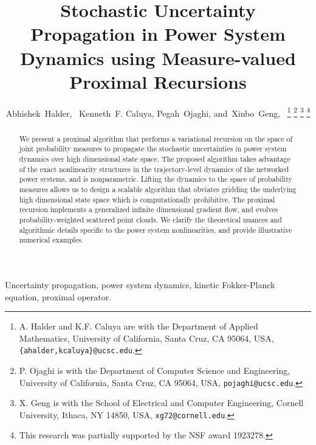 \documentclass[10pt,twocolumn]{IEEEtran}
\begin{document}
\title{\LARGE \bf Stochastic Uncertainty Propagation in Power System Dynamics using Measure-valued Proximal Recursions}

\author{Abhishek~Halder,~ 
        Kenneth~F. Caluya,
        Pegah~Ojaghi,
        and~Xinbo~Geng,~%
\thanks{A. Halder and K.F. Caluya are with the Department of Applied Mathematics, University of California, Santa Cruz, CA 95064, USA, {\texttt{\{ahalder,kcaluya\}@ucsc.edu}}.}%
\thanks{P. Ojaghi is with the Department of Computer Science and Engineering, University of California, Santa Cruz, CA 95064, USA, {\texttt{pojaghi@ucsc.edu}}.}%
\thanks{X. Geng is with the School of Electrical and Computer Engineering, Cornell University, Ithaca, NY 14850, USA, {\texttt{xg72@cornell.edu}}.} %
\thanks{This research was partially supported by the NSF award 1923278.}}%

\maketitle

\begin{abstract}
We present a proximal algorithm that performs a variational recursion on the space of joint probability measures to propagate the stochastic uncertainties in power system dynamics over high dimensional state space. The proposed algorithm takes advantage of the exact nonlinearity structures in the trajectory-level dynamics of the networked power systems, and is nonparametric. Lifting the dynamics to the space of probability measures allows us to design a scalable algorithm that obviates gridding the underlying high dimensional state space which is computationally prohibitive. The proximal recursion implements a generalized infinite dimensional gradient flow, and evolves probability-weighted scattered point clouds. We clarify the theoretical nuances and algorithmic details specific to the power system nonlinearities, and provide illustrative numerical examples.
\end{abstract}

\begin{IEEEkeywords}
Uncertainty propagation, power system dynamics, kinetic Fokker-Planck equation, proximal operator.
\end{IEEEkeywords}
\end{document}
